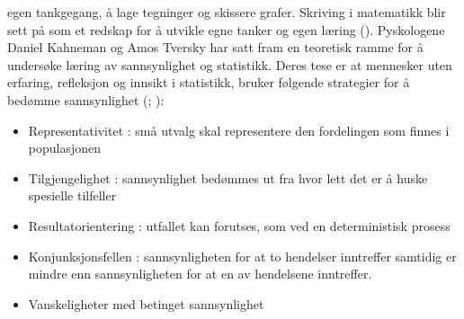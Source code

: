 \documentclass[main.tex]{subfiles}
\begin{document}
egen tankgegang, å lage tegninger og skissere grafer. Skriving i matematikk blir sett på som et redskap for å 
utvikle egne tanker og egen læring ().
\newline\newline
Pyskologene Daniel Kahneman og Amos Tversky har satt fram en teoretisk ramme for å undersøke læring av sannsynlighet og 
statistikk. Deres tese er at mennesker uten erfaring, refleksjon og innsikt i statistikk,
bruker følgende strategier for å bedømme sannsynlighet (; ):
\begin{itemize}
\item Representativitet : små utvalg skal representere den fordelingen som finnes i populasjonen
\item Tilgjengelighet : sannsynlighet bedømmes ut fra hvor lett det er å huske spesielle tilfeller
\item Resultatorientering : utfallet kan forutses, som ved en deterministisk prosess
\item Konjunksjonsfellen : sannsynligheten for at to hendelser inntreffer samtidig er mindre enn sannsynligheten
for at en av hendelsene inntreffer.
\item Vanskeligheter med betinget sannsynlighet
\end{itemize}
\end{document}
